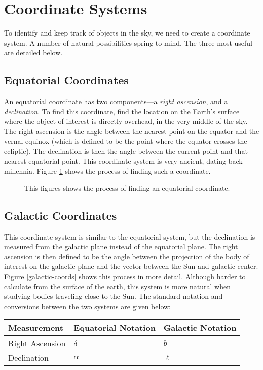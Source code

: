 \documentclass[12pt,twoside]{reedthesis}
\begin{document}
\section*{Coordinate Systems}

To identify and keep track of objects in the sky, we need to create a coordinate system. A number of natural possibilities spring to mind. The three most useful are detailed below.

\subsection*{Equatorial Coordinates}

An equatorial coordinate has two components---a \emph{right ascension}, and a \emph{declination}. To find this coordinate, find the location on the Earth's surface where the object of interest is directly overhead, in the very middle of the sky. The right ascension is the angle between the nearest point on the equator and the vernal equinox (which is defined to be the point where the equator crosses the ecliptic). The declination is then the angle between the current point and that nearest equatorial point. This coordinate system is very ancient, dating back millennia. Figure \ref{equatorial-coords} shows the process of finding such a coordinate.

\begin{figure}[p]
    \caption{This figures shows the process of finding an equatorial coordinate.}
    \label{equatorial-coords}
\end{figure}

\subsection*{Galactic Coordinates}

This coordinate system is similar to the equatorial system, but the declination is measured from the galactic plane instead of the equatorial plane. The right ascension is then defined to be the angle between the projection of the body of interest on the galactic plane and the vector between the Sun and galactic center. Figure \ref{galactic-coords} shows this process in more detail. Although harder to calculate from the surface of the earth, this system is more natural when studying bodies traveling close to the Sun. The standard notation and conversions between the two systems are given below:

\begin{tabular}{lll} \toprule
    Measurement & Equatorial Notation & Galactic Notation \\ \midrule
    Right Ascension &  $\delta$       & $b$               \\
    Declination     &  $\alpha$       & $\ell$            \\ \bottomrule
\end{tabular}
\end{document}
